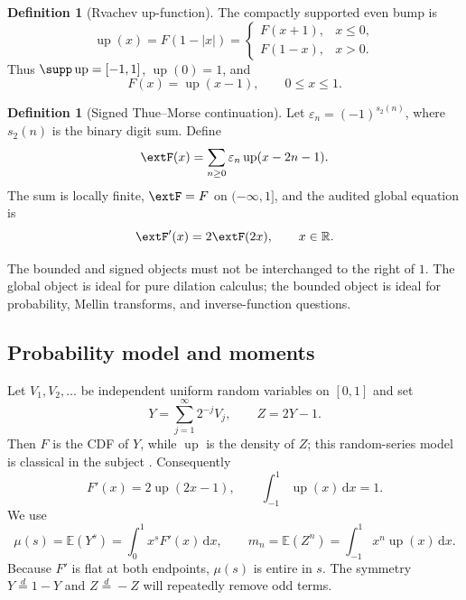 \documentclass[11pt,oneside]{article}
\theoremstyle{definition}
\newtheorem{definition}[theorem]{Definition}
\theoremstyle{remark}
\newcommand{\Up}{\operatorname{up}}
\newcommand{\E}{\mathbb E}
\newcommand{\R}{\mathbb R}
\newcommand{\dd}{\,\mathrm d}
\newcommand{\1}{\mathbf 1}
\begin{document}
\begin{definition}[Rvachev up-function]
The compactly supported even bump is
\begin{equation}
 \Up(x)=F(1-|x|)=
 \begin{cases}
  F(x+1),&x\le0,\\
  F(1-x),&x>0.
 \end{cases}
 \label{p7:eq:up-fold}
\end{equation}
Thus $\supp\Up=[-1,1]$, $\Up(0)=1$, and
\begin{equation}
 F(x)=\Up(x-1),\qquad 0\le x\le1.
 \label{p7:eq:F-up-translate}
\end{equation}
\end{definition}

\begin{definition}[Signed Thue--Morse continuation]
Let $\varepsilon_n=(-1)^{s_2(n)}$, where $s_2(n)$ is the binary digit sum.  Define
\begin{equation}
 \extF(x)=\sum_{n\ge0}\varepsilon_n\Up(x-2n-1).
 \label{p7:eq:global-F}
\end{equation}
The sum is locally finite, $\extF=F$ on $(-\infty,1]$, and the audited global equation is
\begin{equation}
 \extF'(x)=2\extF(2x),\qquad x\in\R.
 \label{p7:eq:global-dilation}
\end{equation}
\end{definition}

The bounded and signed objects must not be interchanged to the right of $1$.  The global
object is ideal for pure dilation calculus; the bounded object is ideal for probability,
Mellin transforms, and inverse-function questions.

\subsection{Probability model and moments}

Let $V_1,V_2,\ldots$ be independent uniform random variables on $[0,1]$ and set
\begin{equation}
 Y=\sum_{j=1}^{\infty}2^{-j}V_j,
 \qquad
 Z=2Y-1.
 \label{p7:eq:Y-Z}
\end{equation}
Then $F$ is the CDF of $Y$, while $\Up$ is the density of $Z$; this random-series model
is classical in the subject \cite{p7:arias1982,p7:arias2018,p7:project-frontier}.  Consequently
\begin{equation}
 F'(x)=2\Up(2x-1),
 \qquad
 \int_{-1}^{1}\Up(x)\dd x=1.
 \label{p7:eq:Fprime-up}
\end{equation}
We use
\begin{equation}
 \mu(s)=\E(Y^s)=\int_0^1x^sF'(x)\dd x,
 \qquad
 m_n=\E(Z^n)=\int_{-1}^{1}x^n\Up(x)\dd x.
 \label{p7:eq:moments}
\end{equation}
Because $F'$ is flat at both endpoints, $\mu(s)$ is entire in $s$.  The symmetry
$Y\overset d=1-Y$ and $Z\overset d=-Z$ will repeatedly remove odd terms.
\end{document}

